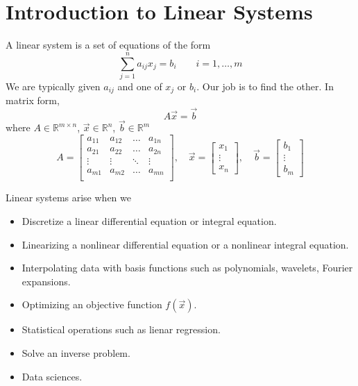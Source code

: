 \section{Introduction to Linear Systems}
A linear system is a set of equations of the form 
%
\begin{equation*}
    \sum_{j=1}^n a_{ij} x_j  = b_i \qquad i=1, \ldots, m
\end{equation*}
%
We are typically given $a_{ij}$ and one of $x_j$ or $b_i$. 
Our job is to find the other. In matrix form, 
\begin{equation*}
    A \Vec{x} = \Vec{b}
\end{equation*}
where 
$A \in \mathbb{R}^{m \times n}$, 
$\Vec{x}\in \mathbb{R}^{n}$, 
$\Vec{b}\in \mathbb{R}^{m}$
%
\begin{equation*}
    A = 
    \begin{bmatrix}
    a_{11} & a_{12} & \ldots & a_{1n}\\
    a_{21} & a_{22} & \ldots & a_{2n}\\
    \vdots & \vdots  & \ddots & \vdots\\
    a_{m1} & a_{m2} & \ldots & a_{mn}\\
    \end{bmatrix}
    ,\quad
    \Vec{x}  = \begin{bmatrix}x_1\\\vdots\\x_n\end{bmatrix}
    ,\quad
    \Vec{b}  = \begin{bmatrix}b_1\\\vdots\\b_m\end{bmatrix}
\end{equation*}

Linear systems arise when we 
\begin{itemize}[label={--}]
    \item Discretize a linear differential equation or integral equation.
    \item Linearizing a nonlinear differential equation 
	    or a nonlinear integral equation.
    \item Interpolating data with basis functions 
	    such as polynomials, wavelets, Fourier expansions.
    \item Optimizing an objective function $f\left(\Vec{x}\right)$. 
    \item Statistical operations such as lienar regression. 
    \item Solve an inverse problem. 
    \item Data sciences.
\end{itemize}

